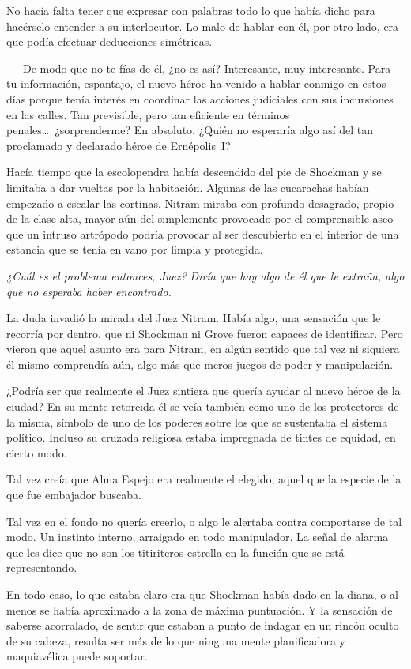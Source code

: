 No hacía falta tener que expresar con palabras todo lo que había dicho para hacérselo entender a su interlocutor. Lo malo de hablar con él, por otro lado, era que podía efectuar deducciones simétricas.

~---De modo que no te fías de él, ¿no es así? Interesante, muy interesante. Para tu información, espantajo, el nuevo héroe ha venido a hablar conmigo en estos días porque tenía interés en coordinar las acciones judiciales con sus incursiones en las calles. Tan previsible, pero tan eficiente en términos penales\dots\ ¿sorprenderme? En absoluto. ¿Quién no esperaría algo así del tan proclamado y declarado héroe de Ernépolis~I?

Hacía tiempo que la escolopendra había descendido del pie de Shockman y se limitaba a dar vueltas por la habitación. Algunas de las cucarachas habían empezado a escalar las cortinas. Nitram miraba con profundo desagrado, propio de la clase alta, mayor aún del simplemente provocado por el comprensible asco que un intruso artrópodo podría provocar al ser descubierto en el interior de una estancia que se tenía en vano por limpia y protegida.

\emph{¿Cuál es el problema entonces, Juez? Diría que hay algo de él que le extraña, algo que no esperaba haber encontrado.}

La duda invadió la mirada del Juez Nitram. Había algo, una sensación que le recorría por dentro, que ni Shockman ni Grove fueron capaces de identificar. Pero vieron que aquel asunto era para Nitram, en algún sentido que tal vez ni siquiera él mismo comprendía aún, algo más que meros juegos de poder y manipulación.

¿Podría ser que realmente el Juez sintiera que quería ayudar al nuevo héroe de la ciudad? En su mente retorcida él se veía también como uno de los protectores de la misma, símbolo de uno de los poderes sobre los que se sustentaba el sistema político. Incluso su cruzada religiosa estaba impregnada de tintes de equidad, en cierto modo.

Tal vez creía que Alma Espejo era realmente el elegido, aquel que la especie de la que fue embajador buscaba.

Tal vez en el fondo no quería creerlo, o algo le alertaba contra comportarse de tal modo. Un instinto interno, arraigado en todo manipulador. La señal de alarma que les dice que no son los titiriteros estrella en la función que se está representando.

En todo caso, lo que estaba claro era que Shockman había dado en la diana, o al menos se había aproximado a la zona de máxima puntuación. Y la sensación de saberse acorralado, de sentir que estaban a punto de indagar en un rincón oculto de su cabeza, resulta ser más de lo que ninguna mente planificadora y maquiavélica puede soportar.

